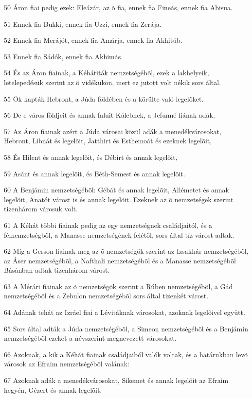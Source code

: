 \par 50 Áron fiai pedig ezek: Eleázár, az õ fia, ennek fia Fineás, ennek fia Abisua.
\par 51 Ennek fia Bukki, ennek fia Uzzi, ennek fia Zerája.
\par 52 Ennek fia Merájót, ennek fia Amárja, ennek fia Akhitúb.
\par 53 Ennek fia Sádók, ennek fia Akhimás.
\par 54 És az Áron fiainak, a Kéhátiták nemzetségébõl, ezek a lakhelyeik, letelepedésük szerint az õ vidékükön, mert ez jutott volt nékik sors által.
\par 55 Õk kapták Hebront, a Júda földében és a körülte való legelõket.
\par 56 De e város földjeit és annak faluit Kálebnek, a Jefunné fiának adák.
\par 57 Az Áron fiainak azért a Júda városai közül adák a menedékvárosokat, Hebront, Libnát és legelõit, Jatthirt és Esthemoát és ezeknek legelõit,
\par 58 És Hilent és annak legelõit, és Débirt és annak legelõit,
\par 59 Asánt és annak legelõit, és Béth-Semest és annak legelõit.
\par 60 A Benjámin nemzetségébõl: Gébát és annak legelõit, Allémetet és annak legelõit, Anatót várost is és annak legelõit. Ezeknek az õ nemzetségek szerint tizenhárom városuk volt.
\par 61 A Kéhát többi fiainak pedig az egy nemzetségnek családjaitól, és a félnemzetségbõl, a Manasse nemzetségének felétõl, sors által tíz várost adtak.
\par 62 Míg a Gerson fiainak meg az õ nemzetségök szerint az Izsakhár nemzetségébõl, az Áser nemzetségébõl, a Nafthali nemzetségébõl és a Manasse nemzetségébõl Básánban adtak tizenhárom várost.
\par 63 A Mérári fiainak az õ nemzetségök szerint a Rúben nemzetségébõl, a Gád nemzetségébõl és a Zebulon nemzetségébõl sors által tizenkét várost.
\par 64 Adának tehát az Izráel fiai a Lévitáknak városokat, azoknak legelõivel együtt.
\par 65 Sors által adták a Júda nemzetségébõl, a Simeon nemzetségébõl és a Benjámin nemzetségébõl ezeket a névszerint megnevezett városokat.
\par 66 Azoknak, a kik a Kéhát fiainak családjaiból valók voltak, és a határukban levõ városok az Efraim nemzetségébõl valának:
\par 67 Azoknak adák a menedékvárosokat, Sikemet és annak legelõit az Efraim hegyén, Gézert és annak legelõit.
